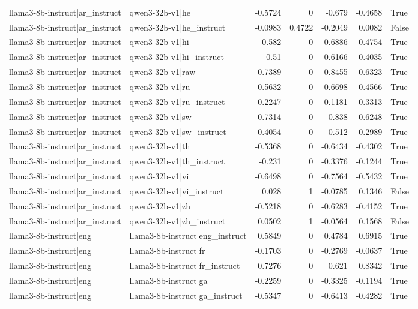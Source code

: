 \begin{table}
\begin{tabular}{l l r r r r l}
llama3-8b-instruct|ar_instruct & qwen3-32b-v1|he & -0.5724 & 0 & -0.679 & -0.4658 & True \\
llama3-8b-instruct|ar_instruct & qwen3-32b-v1|he_instruct & -0.0983 & 0.4722 & -0.2049 & 0.0082 & False \\
llama3-8b-instruct|ar_instruct & qwen3-32b-v1|hi & -0.582 & 0 & -0.6886 & -0.4754 & True \\
llama3-8b-instruct|ar_instruct & qwen3-32b-v1|hi_instruct & -0.51 & 0 & -0.6166 & -0.4035 & True \\
llama3-8b-instruct|ar_instruct & qwen3-32b-v1|raw & -0.7389 & 0 & -0.8455 & -0.6323 & True \\
llama3-8b-instruct|ar_instruct & qwen3-32b-v1|ru & -0.5632 & 0 & -0.6698 & -0.4566 & True \\
llama3-8b-instruct|ar_instruct & qwen3-32b-v1|ru_instruct & 0.2247 & 0 & 0.1181 & 0.3313 & True \\
llama3-8b-instruct|ar_instruct & qwen3-32b-v1|sw & -0.7314 & 0 & -0.838 & -0.6248 & True \\
llama3-8b-instruct|ar_instruct & qwen3-32b-v1|sw_instruct & -0.4054 & 0 & -0.512 & -0.2989 & True \\
llama3-8b-instruct|ar_instruct & qwen3-32b-v1|th & -0.5368 & 0 & -0.6434 & -0.4302 & True \\
llama3-8b-instruct|ar_instruct & qwen3-32b-v1|th_instruct & -0.231 & 0 & -0.3376 & -0.1244 & True \\
llama3-8b-instruct|ar_instruct & qwen3-32b-v1|vi & -0.6498 & 0 & -0.7564 & -0.5432 & True \\
llama3-8b-instruct|ar_instruct & qwen3-32b-v1|vi_instruct & 0.028 & 1 & -0.0785 & 0.1346 & False \\
llama3-8b-instruct|ar_instruct & qwen3-32b-v1|zh & -0.5218 & 0 & -0.6283 & -0.4152 & True \\
llama3-8b-instruct|ar_instruct & qwen3-32b-v1|zh_instruct & 0.0502 & 1 & -0.0564 & 0.1568 & False \\
llama3-8b-instruct|eng & llama3-8b-instruct|eng_instruct & 0.5849 & 0 & 0.4784 & 0.6915 & True \\
llama3-8b-instruct|eng & llama3-8b-instruct|fr & -0.1703 & 0 & -0.2769 & -0.0637 & True \\
llama3-8b-instruct|eng & llama3-8b-instruct|fr_instruct & 0.7276 & 0 & 0.621 & 0.8342 & True \\
llama3-8b-instruct|eng & llama3-8b-instruct|ga & -0.2259 & 0 & -0.3325 & -0.1194 & True \\
llama3-8b-instruct|eng & llama3-8b-instruct|ga_instruct & -0.5347 & 0 & -0.6413 & -0.4282 & True \\

\end{tabular}
\end{table}

